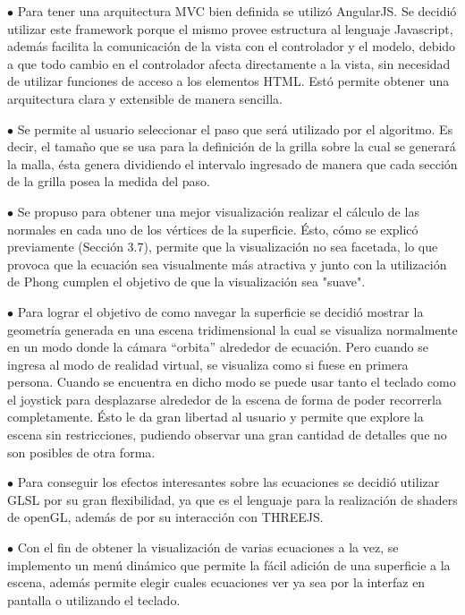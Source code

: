 \documentclass[12pt]{article}
\begin{document}
$\bullet$ Para tener una arquitectura MVC bien definida se utilizó AngularJS. Se decidió utilizar este framework porque el mismo provee estructura al lenguaje Javascript, además facilita la comunicación de la vista con el controlador y el modelo, debido a que todo cambio en el controlador afecta directamente a la vista, sin necesidad de utilizar funciones de acceso a los elementos HTML. Estó permite obtener una arquitectura clara y extensible de manera sencilla.

$\bullet$ Se permite al usuario seleccionar el paso que será utilizado por el algoritmo. Es decir, el tamaño que se usa para la definición de la grilla sobre la cual se generará la malla, ésta genera dividiendo el intervalo ingresado de manera que cada sección de la grilla posea la medida del paso. 

$\bullet$ Se propuso para obtener una mejor visualización realizar el cálculo de las normales en cada uno  de los vértices de la superficie. Ésto, cómo se explicó previamente  (Sección 3.7), permite que la visualización no sea facetada, lo que provoca que la ecuación sea visualmente más atractiva y junto con la utilización de Phong cumplen el objetivo de que la visualización sea "suave". 

$\bullet$ Para lograr el objetivo de como navegar la superficie se decidió mostrar la geometría generada en una escena tridimensional la cual se visualiza normalmente en un modo donde la cámara “orbita” alrededor de ecuación. Pero cuando se ingresa al modo de realidad virtual, se visualiza como si fuese en primera persona. Cuando se encuentra en dicho modo se puede usar tanto el teclado como el joystick para desplazarse alrededor de la escena de forma de poder recorrerla completamente. Ésto le da gran libertad al usuario y permite que explore la escena sin restricciones, pudiendo observar una gran cantidad de detalles que no son posibles de otra forma.


$\bullet$ Para conseguir los efectos interesantes sobre las ecuaciones se decidió utilizar GLSL por su gran flexibilidad, ya que es el lenguaje para la realización de shaders de openGL, además de por su interacción con THREEJS. 

$\bullet$ Con el fin de obtener la visualización de varias ecuaciones a la vez, se implemento un menú dinámico que permite la fácil adición de una superficie a la escena, además permite elegir cuales ecuaciones ver ya sea por la interfaz en pantalla o utilizando el teclado.
\end{document}
